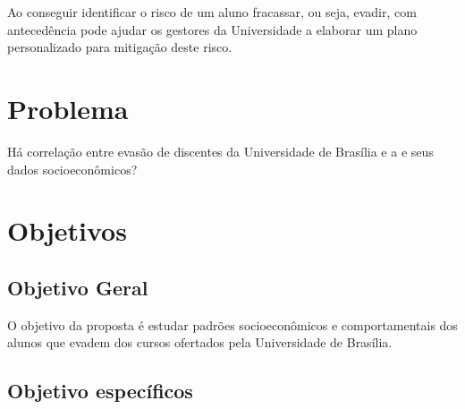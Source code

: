 Ao conseguir identificar o risco de um aluno fracassar, ou seja, evadir, com antecedência pode ajudar os gestores da Universidade a elaborar um plano personalizado para mitigação deste risco.

\section{Problema}%

Há correlação entre evasão de discentes da Universidade de Brasília e a e seus dados socioeconômicos?
\section{Objetivos}%

\subsection{Objetivo Geral}

O objetivo da proposta é estudar padrões socioeconômicos e comportamentais dos alunos que evadem dos cursos ofertados pela Universidade de Brasília. 
 
\subsection{Objetivo específicos}

